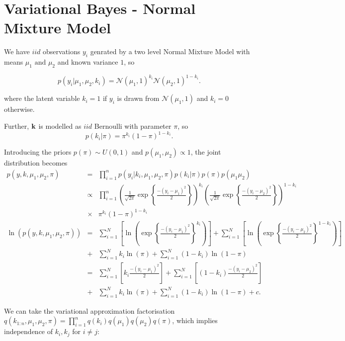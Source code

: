 \documentclass[12pt]{article}
\begin{document}



\section{Variational Bayes - Normal Mixture Model}

We have $iid$ observations $y_i$ genrated by a two level Normal Mixture Model with means $\mu_1 \mbox{ and } \mu_2$ and known variance $1$, so

$$p(y_i | \mu_1, \mu_2, k_i) = \mathcal{N}(\mu_1, 1)^{k_i} \mathcal{N}(\mu_2, 1)^{1-k_i}.$$

where the latent variable $k_i = 1$ if $y_i$ is drawn from $\mathcal{N}(\mu_1, 1)$ and $k_i = 0$ otherwise.

Further, $\bold{k}$ is modelled as $iid$ Bernoulli with parameter $\pi$, so
$$p(k_i | \pi) = \pi^{k_i} (1-\pi)^{1-k_i}. $$

Introducing the priors $p(\pi) \sim U(0, 1)$ and $p(\mu_1, \mu_2) \propto 1$, the joint distribution becomes
\begin{eqnarray}
\label{1}
p(y, k, \mu_1, \mu_2, \pi) & = & \prod^{n}_{i=1} p(y_i | k_i, \mu_1, \mu_2, \pi) p(k_i | \pi) p(\pi) p(\mu_1 \mu_2) \nonumber \\
& \propto & \prod^{n}_{i=1} \left(\frac{1}{\sqrt{2\pi}} \exp \left\{\frac{-(y_i-\mu_1)^2}{2}\right\}\right)^{k_i} \left(\frac{1}{\sqrt{2\pi}} \exp \left\{\frac{-(y_i-\mu_2)^2}{2}\right\}\right)^{1-k_i} \nonumber \\
& \times & \pi^{k_i} (1-\pi)^{1-k_i} \nonumber \\
\ln(p(y, k, \mu_1, \mu_2, \pi)) & = & \sum_{i=1}^{N} \left[ \ln\left(\exp \left\{\frac{-(y_i-\mu_1)^2}{2}\right\}^{k_i}\right)\right] + \sum_{i=1}^{N} \left[ \ln\left(\exp \left\{\frac{-(y_i-\mu_2)^2}{2}\right\}^{1-k_i}\right)\right] \nonumber \\
& + & \sum_{i=1}^{N} k_i \ln(\pi) + \sum_{i=1}^{N} (1-k_i) \ln(1-\pi) \nonumber \\
& = & \sum_{i=1}^{N} \left[ k_{i} \frac{-(y_i-\mu_1)^2}{2}\right] + \sum_{i=1}^{N} \left[ (1-k_{i}) \frac{-(y_i-\mu_2)^2}{2}\right] \nonumber \\
& + & \sum_{i=1}^{N} k_i \ln(\pi) + \sum_{i=1}^{N} (1-k_i) \ln(1-\pi) + c.
\end{eqnarray}

We can take the variational approximation factorisation $q(k_{1:n}, \mu_1, \mu_2, \pi) = \prod_{i=1}^{n} q(k_i)q(\mu_1)q(\mu_2)q(\pi)$, which implies independence of $k_i, k_j$ for $i \neq j$:
\end{document}

